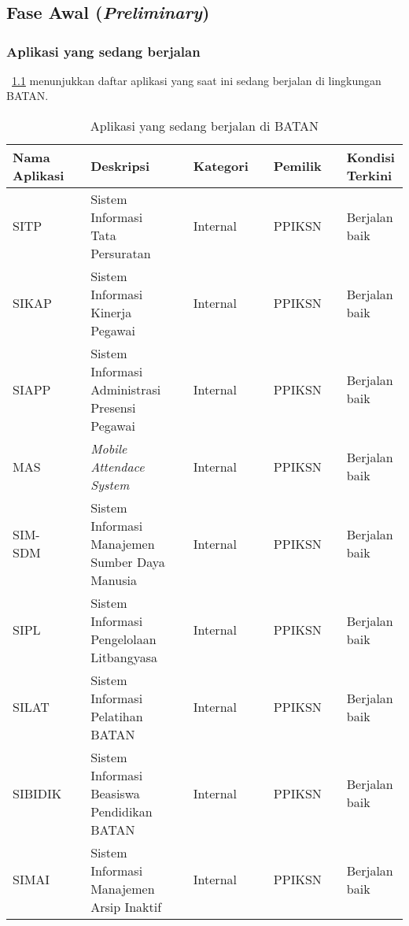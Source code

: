 \chapter{\babDua}
\section{Fase Awal (\textit{Preliminary})}
\subsection{Aplikasi yang sedang berjalan}

\tablename~\ref{tab:current} menunjukkan daftar aplikasi yang saat ini sedang berjalan di lingkungan BATAN.

\begin{table}[H]
\caption{Aplikasi yang sedang berjalan di BATAN} 
\label{tab:current}
\begin{tabular}{p{1.75cm}p{0.05cm}p{4cm}p{0.05cm}lp{0.05cm}lp{0.05cm}p{2cm}}
\toprule \toprule
Nama Aplikasi && Deskripsi && Kategori && Pemilik && Kondisi Terkini \\ \midrule
SITP && Sistem Informasi Tata Persuratan  && Internal && PPIKSN && Berjalan baik\\ \hline
SIKAP && Sistem Informasi Kinerja Pegawai  && Internal && PPIKSN && Berjalan baik\\ \hline
SIAPP && Sistem Informasi Administrasi Presensi Pegawai  && Internal && PPIKSN && Berjalan baik\\ \hline
MAS && \textit{Mobile Attendace System}  && Internal && PPIKSN && Berjalan baik\\ \hline
SIM-SDM && Sistem Informasi Manajemen Sumber Daya Manusia  && Internal && PPIKSN && Berjalan baik\\ \hline
SIPL && Sistem Informasi Pengelolaan Litbangyasa  && Internal && PPIKSN && Berjalan baik\\ \hline
SILAT && Sistem Informasi Pelatihan BATAN  && Internal && PPIKSN && Berjalan baik\\ \hline
SIBIDIK && Sistem Informasi Beasiswa Pendidikan BATAN  && Internal && PPIKSN && Berjalan baik\\ \hline
SIMAI && Sistem Informasi Manajemen Arsip Inaktif  && Internal && PPIKSN && Berjalan baik\\
\bottomrule
\end{tabular}
\end{table}
